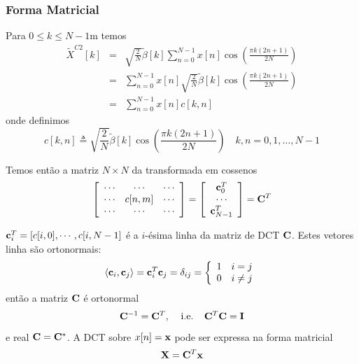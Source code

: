 \begin{frame}[allowframebreaks]
  \frametitle{Forma Matricial}

  Para $0 \leq k \leq N-1$m temos
  \begin{eqnarray}
  \tilde{X}^{C2}[k] &=& \sqrt{\frac{2}{N}} \tilde{\beta}[k] \sum_{n=0}^{N-1} x[n] \cos \left( \frac{\pi k (2n+1)}{2N} \right) \\
        &=& \sum_{n=0}^{N-1} x[n]  \sqrt{\frac{2}{N}}  \tilde{\beta}[k] \cos \left( \frac{\pi k (2n+1)}{2N} \right) \\
        &=& \sum_{n=0}^{N-1} x[n] c[k,n]
  \end{eqnarray}
  onde definimos
  \begin{equation}
  c[k,n] \triangleq \sqrt{\frac{2}{N}}  \tilde{\beta}[k] \cos \left( \frac{\pi k (2n+1)}{2N} \right) \quad  k,n = 0,1,\ldots,N-1
  \end{equation}

  Temos então a matriz $N \times N$ da transformada em cossenos
  \begin{equation}
  \left[ \begin{array}{ccc} \cdots & \cdots & \cdots \\
  \cdots & c[n,m] & \cdots \\ \cdots & \cdots & \cdots \end{array} \right]
  =\left[ \begin{array}{c} {\bf c}_0^T \\ \cdots \\ {\bf c}_{N-1}^T \end{array} \right]
  ={\bf C}^T
  \end{equation}

   ${\bf c}_i^T=[c[i,0],\cdots,c[i,N-1]$ é a $i$-ésima linha da matriz de DCT ${\bf C}$.
   Estes vetores linha são ortonormais:
  \begin{equation}
  \langle {\bf c}_i,{\bf c}_j \rangle = {\bf c}_i^T {\bf c}_j =\delta_{ij}
  =\left\{ \begin{array}{ll}1 & i=j \\ 0 & i\ne j \end{array} \right.
  \end{equation}
  então a matriz ${\bf C}$ é ortonormal
  \begin{equation}
  {\bf C}^{-1}={\bf C}^T,\;\;\;\;\mbox{i.e.} \;\;\;\;{\bf C}^T {\bf C}= {\bf I} 
  \end{equation}
  e real ${\bf C}={\bf C}^*$. A DCT sobre $x[n] = {\bf x}$ pode ser expressa na forma matricial
  \begin{equation}
  {\bf X}={\bf C}^T {\bf x}
  \end{equation}
\end{frame}

